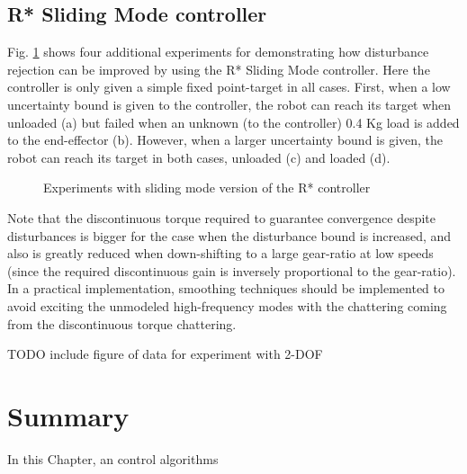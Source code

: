 \subsection{R* Sliding Mode controller}

Fig. \ref{fig:rob} shows four additional experiments for demonstrating how disturbance rejection can be improved by using the  R* Sliding Mode controller. Here the controller is only given a simple fixed point-target in all cases. First, when a low uncertainty bound is given to the controller, the robot can reach its target when unloaded (a) but failed when an unknown (to the controller) 0.4 Kg load is added to the end-effector (b). However, when a larger uncertainty bound is given, the robot can reach its target in both cases, unloaded (c) and loaded (d). 

\begin{figure}[htp]
        \centering
				\hspace{-10pt}
				\hspace{-5pt}
				\hspace{-5pt}
				\hspace{-5pt}
        \caption{Experiments with sliding mode version of the R* controller }
				\label{fig:rob}
\end{figure}

Note that the discontinuous torque required to guarantee convergence despite disturbances is bigger for the case when the disturbance bound is increased, and also is greatly reduced when down-shifting to a large gear-ratio at low speeds (since the required discontinuous gain is inversely proportional to the gear-ratio). In a practical implementation, smoothing techniques should be implemented to avoid exciting the unmodeled high-frequency modes with the chattering coming from the discontinuous torque chattering.

TODO include figure of data for experiment with 2-DOF


\section{Summary}

In this Chapter, an control algorithms 